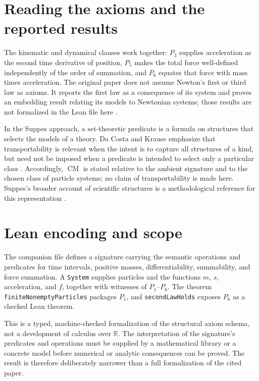 \documentclass[11pt]{article}
\begin{document}
\section{Reading the axioms and the reported results}

The kinematic and dynamical clauses work together: $P_3$ supplies
acceleration as the second time derivative of position, $P_5$ makes the
total force well-defined independently of the order of summation, and
$P_6$ equates that force with mass times acceleration. The original paper
does not assume Newton's first or third law as axioms. It reports the
first law as a consequence of its system and proves an embedding result
relating its models to Newtonian systems; those results are not formalized
in the Lean file here \cite{mckinsey1953axiomatic}.

In the Suppes approach, a set-theoretic predicate is a formula on
structures that selects the models of a theory. Da Costa and Krause
emphasize that transportability is relevant when the intent is to capture
all structures of a kind, but need not be imposed when a predicate is
intended to select only a particular class \cite{daCostaKrause2020}.
Accordingly, $\operatorname{CM}$ is stated relative to the ambient
signature and to the chosen class of particle systems; no claim of
transportability is made here. Suppes's broader account of scientific
structures is a methodological reference for this representation
\cite{suppes2002representation}.

\section{Lean encoding and scope}

The companion file \texttt{}
defines a signature carrying the semantic operations and predicates for
time intervals, positive masses, differentiability, summability, and force
summation. A \texttt{System} supplies particles and the functions $m$,
$s$, acceleration, and $f$, together with witnesses of $P_1$--$P_6$.
The theorem \texttt{finiteNonemptyParticles} packages $P_1$, and
\texttt{secondLawHolds} exposes $P_6$ as a checked Lean theorem.

This is a typed, machine-checked formalization of the structural axiom
schema, not a development of calculus over $\mathbb{R}$. The interpretation
of the signature's predicates and operations must be supplied by a
mathematical library or a concrete model before numerical or analytic
consequences can be proved. The result is therefore deliberately narrower
than a full formalization of the cited paper.



\end{document}
